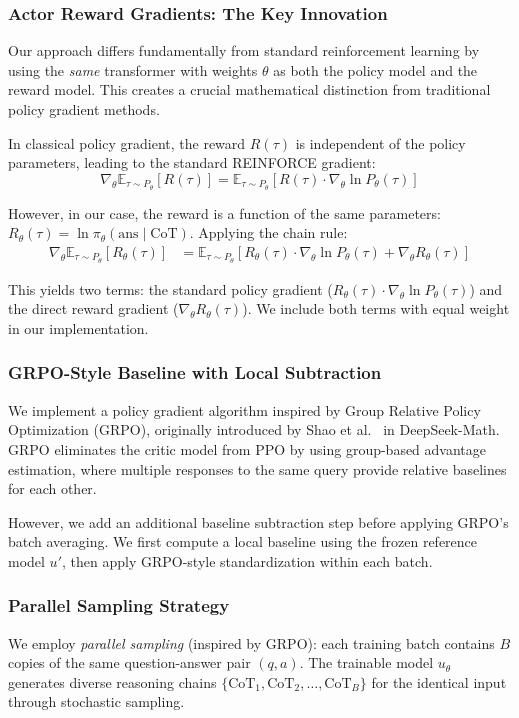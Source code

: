 \documentclass[letterpaper]{article} %
\begin{document}
\subsubsection{Actor Reward Gradients: The Key Innovation}
Our approach differs fundamentally from standard reinforcement learning by using the \emph{same} transformer with weights $\theta$ as both the policy model and the reward model. This creates a crucial mathematical distinction from traditional policy gradient methods.

In classical policy gradient, the reward $R(\tau)$ is independent of the policy parameters, leading to the standard REINFORCE gradient:
$$\nabla_\theta \mathbb{E}_{\tau \sim P_\theta}[R(\tau)] = \mathbb{E}_{\tau \sim P_\theta}[R(\tau) \cdot \nabla_\theta \ln P_\theta(\tau)]$$

However, in our case, the reward is a function of the same parameters: $R_\theta(\tau) = \ln \pi_\theta(\text{ans} \mid \text{CoT})$. Applying the chain rule:
\begin{align}
\nabla_\theta \mathbb{E}_{\tau \sim P_\theta}[R_\theta(\tau)] &= \mathbb{E}_{\tau \sim P_\theta}[R_\theta(\tau) \cdot \nabla_\theta \ln P_\theta(\tau) + \nabla_\theta R_\theta(\tau)]
\end{align}

This yields two terms: the standard policy gradient ($R_\theta(\tau) \cdot \nabla_\theta \ln P_\theta(\tau)$) and the direct reward gradient ($\nabla_\theta R_\theta(\tau)$). We include both terms with equal weight in our implementation.

\subsubsection{GRPO-Style Baseline with Local Subtraction}
We implement a policy gradient algorithm inspired by Group Relative Policy Optimization (GRPO), originally introduced by Shao et al.~\cite{shao2024deepseekmath} in DeepSeek-Math. GRPO eliminates the critic model from PPO by using group-based advantage estimation, where multiple responses to the same query provide relative baselines for each other.

However, we add an additional baseline subtraction step before applying GRPO's batch averaging. We first compute a local baseline using the frozen reference model $u'$, then apply GRPO-style standardization within each batch.

\subsubsection{Parallel Sampling Strategy}
\label{subsubsec:parallel}
We employ \emph{parallel sampling} (inspired by GRPO): each training batch contains $B$ copies of the same question-answer pair $(q, a)$. The trainable model $u_\theta$ generates diverse reasoning chains $\{\text{CoT}_1, \text{CoT}_2, \ldots, \text{CoT}_B\}$ for the identical input through stochastic sampling.
\end{document}
